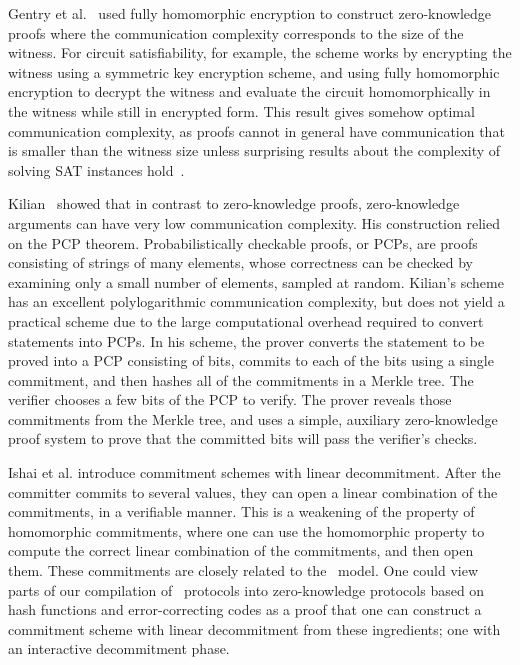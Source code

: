 Gentry et al.~\cite{FHENIZK} used fully homomorphic encryption to construct zero-knowledge proofs where the communication complexity corresponds to the size of the witness. For circuit satisfiability, for example, the scheme works by encrypting the witness using a symmetric key encryption scheme, and using fully homomorphic encryption to decrypt the witness and evaluate the circuit homomorphically in the witness while still in encrypted form. This result gives somehow optimal communication complexity, as proofs cannot in general have communication that is smaller than the witness size unless surprising results about the complexity of solving SAT instances hold~\cite{Goldreich1998,Goldreich2002}.

Kilian~\cite{Kilian1992a} showed that in contrast to zero-knowledge proofs, zero-knowledge arguments can have very low communication complexity. His construction relied on the PCP theorem. Probabilistically checkable proofs, or PCPs, are proofs consisting of strings of many elements, whose correctness can be checked by examining only a small number of elements, sampled at random. Kilian's scheme has an excellent polylogarithmic communication complexity, but does not yield a practical scheme due to the large computational overhead required to convert statements into PCPs. In his scheme, the prover converts the statement to be proved into a PCP consisting of bits, commits to each of the bits using a single commitment, and then hashes all of the commitments in a Merkle tree. The verifier chooses a few bits of the PCP to verify. The prover reveals those commitments from the Merkle tree, and uses a simple, auxiliary zero-knowledge proof system to prove that the committed bits will pass the verifier's checks.

Ishai et al. \cite{Ishai2007} introduce commitment schemes with linear decommitment. After the committer commits to several values, they can open a linear combination of the commitments, in a verifiable manner. This is a weakening of the property of homomorphic commitments, where one can use the homomorphic property to compute the correct linear combination of the commitments, and then open them.  These commitments are closely related to the \ILC\ model. One could view parts of our compilation of \ILC\ protocols into zero-knowledge protocols based on hash functions and error-correcting codes as a proof that one can construct a commitment scheme with linear decommitment from these ingredients; one with an interactive decommitment phase.

